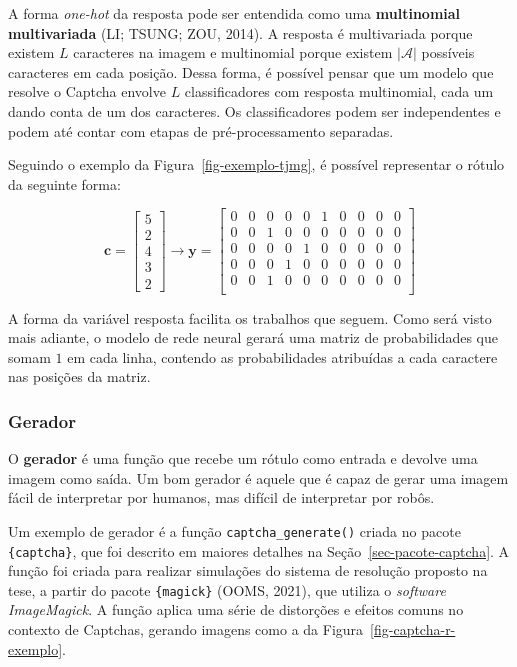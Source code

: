 \documentclass[12pt,twoside,brazilian]{book}
\begin{document}
A forma \emph{one-hot} da resposta pode ser entendida como uma
\textbf{multinomial} \textbf{multivariada} (LI; TSUNG; ZOU, 2014). A
resposta é multivariada porque existem \(L\) caracteres na imagem e
multinomial porque existem \(|\mathcal A|\) possíveis caracteres em cada
posição. Dessa forma, é possível pensar que um modelo que resolve o
Captcha envolve \(L\) classificadores com resposta multinomial, cada um
dando conta de um dos caracteres. Os classificadores podem ser
independentes e podem até contar com etapas de pré-processamento
separadas.

Seguindo o exemplo da Figura~\ref{fig-exemplo-tjmg}, é possível
representar o rótulo da seguinte forma:

\[
\mathbf c = \left[\begin{array}{c}
     5  \\
     2 \\
     4 \\
     3 \\
     2
\end{array}\right] \rightarrow \mathbf{y} = \left[\begin{array}{cccccccccc}
    0 & 0 & 0 & 0 & 0 & 1 & 0 & 0 & 0 & 0 \\
    0 & 0 & 1 & 0 & 0 & 0 & 0 & 0 & 0 & 0 \\
    0 & 0 & 0 & 0 & 1 & 0 & 0 & 0 & 0 & 0 \\
    0 & 0 & 0 & 1 & 0 & 0 & 0 & 0 & 0 & 0 \\
    0 & 0 & 1 & 0 & 0 & 0 & 0 & 0 & 0 & 0 \\
\end{array}\right]
\]

A forma da variável resposta facilita os trabalhos que seguem. Como será
visto mais adiante, o modelo de rede neural gerará uma matriz de
probabilidades que somam \(1\) em cada linha, contendo as probabilidades
atribuídas a cada caractere nas posições da matriz.

\hypertarget{gerador}{%
\subsubsection{Gerador}\label{gerador}}

O \textbf{gerador} é uma função que recebe um rótulo como entrada e
devolve uma imagem como saída. Um bom gerador é aquele que é capaz de
gerar uma imagem fácil de interpretar por humanos, mas difícil de
interpretar por robôs.

Um exemplo de gerador é a função \texttt{captcha\_generate()} criada no
pacote \texttt{\{captcha\}}, que foi descrito em maiores detalhes na
Seção~\ref{sec-pacote-captcha}. A função foi criada para realizar
simulações do sistema de resolução proposto na tese, a partir do pacote
\texttt{\{magick\}} (OOMS, 2021), que utiliza o \emph{software}
\emph{ImageMagick}. A função aplica uma série de distorções e efeitos
comuns no contexto de Captchas, gerando imagens como a da
Figura~\ref{fig-captcha-r-exemplo}.
\end{document}

